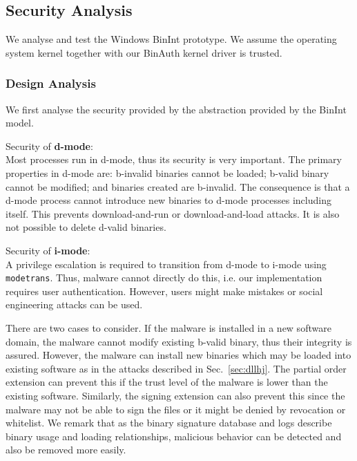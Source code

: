 \subsection{Security Analysis}
\label{sec:binint-secanal}

We analyse and test the Windows BinInt prototype.
We assume the operating system kernel together with our BinAuth
kernel driver is trusted.

\subsubsection{Design Analysis}

We first analyse the security provided by the abstraction
provided by the BinInt model.
\medskip

\noindent
Security of {\bf d-mode}: \\
Most processes run in d-mode, thus its security is very
important.
The primary properties in d-mode are: 
b-invalid binaries cannot be loaded; b-valid binary
cannot be modified; and binaries created are b-invalid.
The consequence is that a d-mode process cannot introduce new
binaries to d-mode processes including itself.
This prevents download-and-run or download-and-load attacks.
It is also not possible to delete d-valid binaries.
\medskip

\noindent
Security of {\bf i-mode}: \\
A privilege escalation is required to transition from d-mode to i-mode
using {\tt modetrans}. Thus, malware cannot directly do this, i.e.
our implementation requires user authentication.
However, users might make mistakes or social engineering attacks can
be used.

There are two cases to consider.
If the malware is installed in a new software domain,
the malware cannot modify existing b-valid binary,
thus their integrity is assured.
However, the malware can install new binaries which may be loaded
into existing software as in the attacks described in Sec.~\ref{sec:dllhj}.
The partial order extension can prevent this if the trust level
of the malware is lower than the existing software.
Similarly, the signing extension can also prevent this since the 
malware may not be able to sign the files or it might be denied by
revocation or whitelist.
We remark that as the binary signature database and logs describe
binary usage and loading relationships, malicious behavior can
be detected and also be removed more easily.

